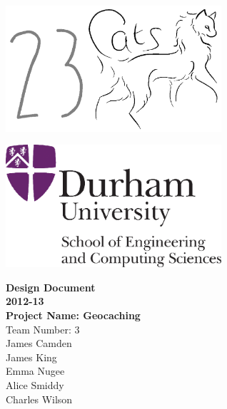 \newcommand{\authorline}[1]{{\LARGE #1}\\[1cm]}

\begin{titlepage}
\begin{center}
\begin{minipage}{0.4\textwidth}
\begin{flushleft}
\includegraphics[width=0.6\textwidth]{cats}~\\[2cm]
\end{flushleft}
\end{minipage}
\begin{minipage}{0.4\textwidth}
\begin{flushright}
\includegraphics[width=0.6\textwidth]{logo}~\\[2cm]
\end{flushright}
\end{minipage}

\vspace{3cm}
{\bf
    {\Huge Design Document} \\
    [1cm]

    {\Huge 2012-13} \\
    [1cm]

    {\Huge Project Name: Geocaching} \\
    [2cm]
}
{\huge Team Number: 3} \\
[1cm]

\authorline{James Camden}

\authorline{James King}

\authorline{Emma Nugee}

\authorline{Alice Smiddy}

\authorline{Charles Wilson}
\end{center}
\end{titlepage}
